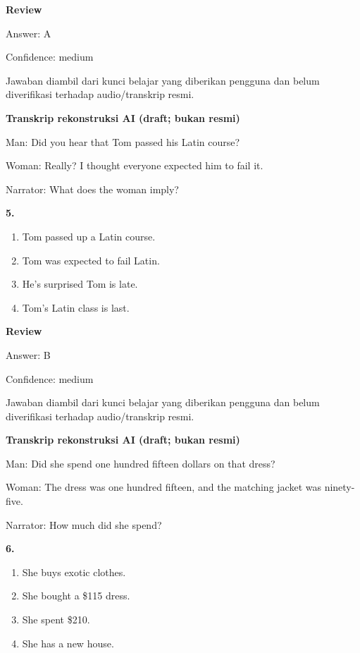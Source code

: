 \documentclass[12pt]{article}
\begin{document}
\setlength{\parindent}{0pt}
\textbf{Review}\par
Answer: A\par
Confidence: medium\par
Jawaban diambil dari kunci belajar yang diberikan pengguna dan belum diverifikasi terhadap audio/transkrip resmi.\par
\endgroup
\par
\vspace{0.25\baselineskip}
\begin{exampleblock}
\textbf{Transkrip rekonstruksi AI (draft; bukan resmi)}\par
Man: Did you hear that Tom passed his Latin course?\par
Woman: Really? I thought everyone expected him to fail it.\par
Narrator: What does the woman imply?\par
\end{exampleblock}
\noindent\textbf{5.}
\begin{enumerate}[label=(\Alph*),leftmargin=*,itemsep=0.2em]
\item Tom passed up a Latin course.
\item Tom was expected to fail Latin.
\item He's surprised Tom is late.
\item Tom's Latin class is last.
\end{enumerate}
\par
\begingroup
\setlength{\parskip}{0pt}
\setlength{\parindent}{0pt}
\textbf{Review}\par
Answer: B\par
Confidence: medium\par
Jawaban diambil dari kunci belajar yang diberikan pengguna dan belum diverifikasi terhadap audio/transkrip resmi.\par
\endgroup
\par
\vspace{0.25\baselineskip}
\begin{exampleblock}
\textbf{Transkrip rekonstruksi AI (draft; bukan resmi)}\par
Man: Did she spend one hundred fifteen dollars on that dress?\par
Woman: The dress was one hundred fifteen, and the matching jacket was ninety-five.\par
Narrator: How much did she spend?\par
\end{exampleblock}
\noindent\textbf{6.}
\begin{enumerate}[label=(\Alph*),leftmargin=*,itemsep=0.2em]
\item She buys exotic clothes.
\item She bought a \$115 dress.
\item She spent \$210.
\item She has a new house.
\end{enumerate}
\end{document}
